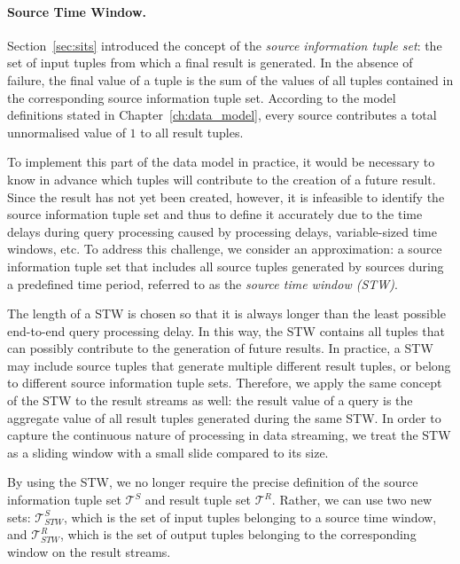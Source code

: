 \paragraph*{Source Time Window.}
\label{sec:stw}
Section~\ref{sec:sits} introduced the concept of the \emph{source information tuple set}: the set of
input tuples from which a final result is generated. In the absence of failure, the final \sic value of a
tuple is the sum of the \sic values of all tuples contained in the corresponding source information tuple
set.
According to the model definitions stated in Chapter~\ref{ch:data_model}, every source contributes a
total unnormalised \sic value of $1$ to all result tuples. 

To implement this part of the data model in practice, it would be necessary to know in advance which
tuples will contribute to the creation of a future result. Since the result has not yet been created,
however, it is infeasible to identify the source information tuple set and thus to define it accurately
due to the time delays during query processing caused by processing delays, variable-sized time windows,
etc.
To address this challenge, we consider an approximation: a source information tuple set that includes all
source tuples generated by sources during a predefined time period, referred to as the \emph{source time window (STW)}.

The length of a STW is chosen so that it is always longer than the least possible end-to-end query
processing delay.
In this way, the STW contains all tuples that can possibly contribute to the generation of future results.
In practice, a STW may include source tuples that generate multiple different result tuples, or
belong to different source information tuple sets.
Therefore, we apply the same concept of the STW to the result streams as well: the result \sic value of a
query is the aggregate \sic value of all result tuples generated during the same STW.
In order to capture the continuous nature of processing in data streaming, we treat the STW as a
sliding window with a small slide compared to its size.

By using the STW, we no longer require the precise definition of the source information tuple set
$\mathcal{T}^{S}$ and result tuple set $\mathcal{T}^{R}$. Rather, we can use two new sets:
$\mathcal{T}^{S}_{STW}$, which is the set of input tuples belonging to a source time window, and
$\mathcal{T}^{R}_{STW}$, which is the set of output tuples belonging to the corresponding window on
the result streams. 

